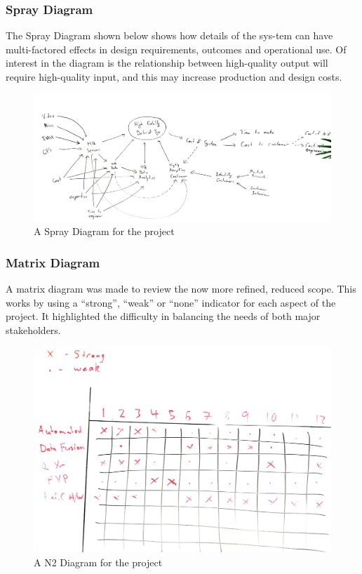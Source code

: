 \documentclass{UoNMCHA}
\numberwithin{equation}{section}
\begin{document}
\subsubsection{Spray Diagram}
The Spray Diagram shown below shows how details of the sys-tem can have multi-factored effects in design requirements, outcomes and operational use. Of interest in the diagram is the relationship between high-quality output will require high-quality input, and this may increase production and design costs. 
\begin{figure}[ht]
    \begin{center}
        \includegraphics[width=0.8\linewidth]{Figures/SprayDiagram.png}
        \caption{A Spray Diagram for the project}
        \label{fig:AndroidDataExample}
    \end{center}
 \end{figure}
\subsubsection{Matrix Diagram}
A matrix diagram was made to review the now more refined, reduced scope. This works by using a “strong”, “weak” or “none” indicator for each aspect of the project. It highlighted the difficulty in balancing the needs of both major stakeholders.
\begin{figure}[ht]
    \begin{center}
        \includegraphics[width=0.8\linewidth]{Figures/MatrixDiagram.png}
        \caption{A N2 Diagram for the project}
        \label{fig:AndroidDataExample}
    \end{center}
 \end{figure}
\end{document}
